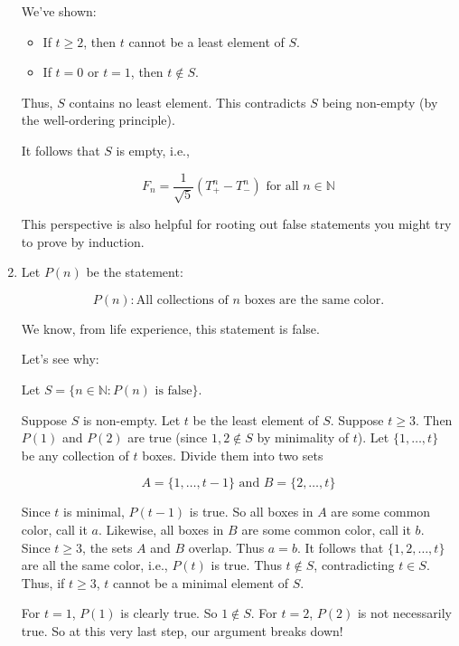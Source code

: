\documentclass[11pt]{article}
\begin{document}
\begin{enumerate}
          We've shown:
          \begin{itemize}
              \item If $t \geq 2$, then $t$ cannot be a least element of $S$.
              \item If $t = 0$ or $t = 1$, then $t \notin S$.
          \end{itemize}

          Thus, $S$ contains no least element. This contradicts $S$ being non-empty (by
          the well-ordering principle).

          It follows that $S$ is empty, i.e.,

          \[
              F_n = \frac{1}{\sqrt{5}} \left( T_+^n - T_-^n \right) \text{ for all } n \in \mathbb{N}
          \]

          This perspective is also helpful for rooting out false statements you might try
          to prove by induction.

    \item Let $P(n)$ be the statement:

          \[ P(n) : \text{All collections of } n \text{ boxes are the same color.} \]

          We know, from life experience, this statement is false.

          Let's see why:

          Let $S = \{ n \in \mathbb{N} : P(n) \text{ is false} \}$.

          Suppose $S$ is non-empty. Let $t$ be the least element of $S$. Suppose $t \geq
              3$. Then $P(1)$ and $P(2)$ are true (since $1, 2 \notin S$ by minimality of
          $t$). Let $\{1, \ldots, t\}$ be any collection of $t$ boxes. Divide them into
          two sets

          \[ A = \{1, \ldots, t-1\} \text{ and } B = \{2, \ldots, t\} \]

          Since $t$ is minimal, $P(t-1)$ is true. So all boxes in $A$ are some common
          color, call it $a$. Likewise, all boxes in $B$ are some common color, call it
          $b$. Since $t \geq 3$, the sets $A$ and $B$ overlap. Thus $a = b$. It follows
          that $\{1, 2, \ldots, t\}$ are all the same color, i.e., $P(t)$ is true. Thus
          $t \notin S$, contradicting $t \in S$. Thus, if $t \geq 3$, $t$ cannot be a
          minimal element of $S$.

          For $t = 1$, $P(1)$ is clearly true. So $1 \notin S$. For $t = 2$, $P(2)$ is
          not necessarily true. So at this very last step, our argument breaks down!
\end{enumerate}
\end{document}
